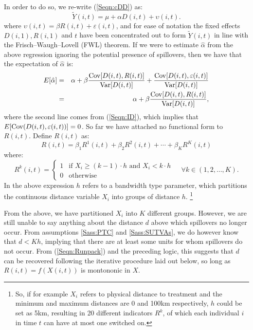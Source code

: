 In order to do so, we re-write (\ref{Seqn:cDD}) as:
\begin{equation}
\label{Seqn:cDDconc}
\tilde{Y}(i,t)=\mu + \alpha D(i,t) + \upsilon(i,t).
\end{equation}
where $\upsilon(i,t)=\beta R(i,t)+\varepsilon(i,t)$, and for ease of notation
the fixed effects $D(i,1), R(i,1)$ and $t$ have been concentrated out to form
$\tilde{Y}(i,t)$ in line with the  Frisch--Waugh--Lovell (FWL) theorem.  If we 
were to estimate $\hat\alpha$ from the above regression ignoring the potential 
presence of spillovers, then we have that the expectation of $\hat\alpha$ is:
\begin{eqnarray}
\label{Seqn:alphaExp}
E[\hat\alpha] &=& \alpha + \beta\frac{\mathrm{Cov}[D(i,t),R(i,t)]}{\mathrm{Var}[D(i,t)]}+\frac{\mathrm{Cov}[D(i,t),\varepsilon(i,t)]}{\mathrm{Var}[D(i,t)]} \nonumber \\ 
              &=& \alpha + \beta\frac{\mathrm{Cov}[D(i,t),R(i,t)]}{\mathrm{Var}[D(i,t)]},
\end{eqnarray}
where the second line comes from (\ref{Seqn:ID}), which implies that 
$E[\mathrm{Cov}(D(i,t),\varepsilon(i,t))]=0$.  So far we have attached no functional form 
to $R(i,t)$.  Define $R(i,t)$ as:
\begin{equation}
\label{Seqn:Runpack}
R(i,t) = \beta_1R^1(i,t)+\beta_2R^2(i,t)+ \cdots + \beta_KR^K(i,t)
\end{equation}  
where:
\begin{equation}
\label{Seqn:Rpar}
 R^k(i,t) =
  \begin{cases}
   1   & \text{if\ \ } X_i\geq(k-1)\cdot h \text{\ \ and \ } X_i<k\cdot h \\
   0   & \text{otherwise} 
  \end{cases}\ \ \ \ \ \forall k \in (1,2,\ldots,K).
\end{equation}
In the above expression $h$ refers to a bandwidth type parameter, which 
partitions the continuous distance variable $X_i$ into groups of distance $h$.%
\footnote{So, if for example $X_i$ refers to physical distance to treatment and 
the minimum and maximum distances are 0 and 100km respectively, $h$ could be set 
as 5km, resulting in 20 different indicators $R^k$, of which each individual $i$ 
in time $t$ can have at most one switched on.}

From the above, we have partitioned $X_i$ into $K$ different groups. However, we
are still unable to say anything about the distance $d$ above which spillovers no 
longer occur. From assumptions \ref{Sass:PTC} and \ref{Sass:SUTVAs}, we do 
however know that $d<Kh$, implying that there are at least some units for whom 
spillovers do not occur.  From (\ref{Seqn:Runpack}) and the preceding logic, this 
suggests that $d$ can be recovered following the iterative procedure laid out 
below, so long as $R(i,t)=f(X(i,t))$ is montononic in $X$.

